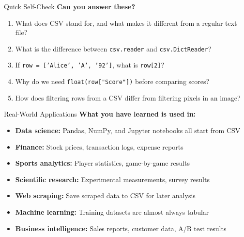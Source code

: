 \documentclass{csbeamer}
\begin{document}
\begin{frame}{Quick Self-Check}
    \textbf{Can you answer these?}

    \vspace{1em}

    \begin{enumerate}
        \item What does CSV stand for, and what makes it different from a regular text file?
        \item What is the difference between \texttt{csv.reader} and \texttt{csv.DictReader}?
        \item If \texttt{row = ['Alice', 'A', '92']}, what is \texttt{row[2]}?
        \item Why do we need \texttt{float(row["Score"])} before comparing scores?
        \item How does filtering rows from a CSV differ from filtering pixels in an image?
    \end{enumerate}
\end{frame}

\begin{frame}{Real-World Applications}
    \textbf{What you have learned is used in:}

    \vspace{1em}

    \begin{itemize}
        \item \textbf{Data science:} Pandas, NumPy, and Jupyter notebooks all start from CSV
        \item \textbf{Finance:} Stock prices, transaction logs, expense reports
        \item \textbf{Sports analytics:} Player statistics, game-by-game results
        \item \textbf{Scientific research:} Experimental measurements, survey results
        \item \textbf{Web scraping:} Save scraped data to CSV for later analysis
        \item \textbf{Machine learning:} Training datasets are almost always tabular
        \item \textbf{Business intelligence:} Sales reports, customer data, A/B test results
    \end{itemize}

\end{frame}
\end{document}
